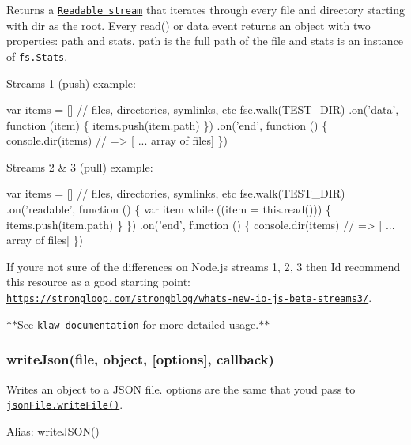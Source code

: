 Returns a \href{https://nodejs.org/api/stream.html#stream_class_stream_readable}{\tt Readable stream} that iterates through every file and directory starting with {\ttfamily dir} as the root. Every {\ttfamily read()} or {\ttfamily data} event returns an object with two properties\+: {\ttfamily path} and {\ttfamily stats}. {\ttfamily path} is the full path of the file and {\ttfamily stats} is an instance of \href{https://nodejs.org/api/fs.html#fs_class_fs_stats}{\tt fs.\+Stats}.

Streams 1 (push) example\+:


\begin{DoxyCode}
var items = [] // files, directories, symlinks, etc
fse.walk(TEST\_DIR)
  .on('data', function (item) \{
    items.push(item.path)
  \})
  .on('end', function () \{
    console.dir(items) // => [ ... array of files]
  \})
\end{DoxyCode}


Streams 2 \& 3 (pull) example\+:


\begin{DoxyCode}
var items = [] // files, directories, symlinks, etc
fse.walk(TEST\_DIR)
  .on('readable', function () \{
    var item
    while ((item = this.read())) \{
      items.push(item.path)
    \}
  \})
  .on('end', function () \{
    console.dir(items) // => [ ... array of files]
  \})
\end{DoxyCode}


If you\textquotesingle{}re not sure of the differences on Node.\+js streams 1, 2, 3 then I\textquotesingle{}d recommend this resource as a good starting point\+: \href{https://strongloop.com/strongblog/whats-new-io-js-beta-streams3/}{\tt https\+://strongloop.\+com/strongblog/whats-\/new-\/io-\/js-\/beta-\/streams3/}.

$\ast$$\ast$\+See \href{https://github.com/jprichardson/node-klaw}{\tt {\ttfamily klaw} documentation} for more detailed usage.$\ast$$\ast$

\subsubsection*{write\+Json(file, object, \mbox{[}options\mbox{]}, callback)}

Writes an object to a J\+S\+ON file. {\ttfamily options} are the same that you\textquotesingle{}d pass to \href{https://github.com/jprichardson/node-jsonfile#writefilefilename-options-callback}{\tt {\ttfamily json\+File.\+write\+File()}}.

Alias\+: {\ttfamily write\+J\+S\+O\+N()}


